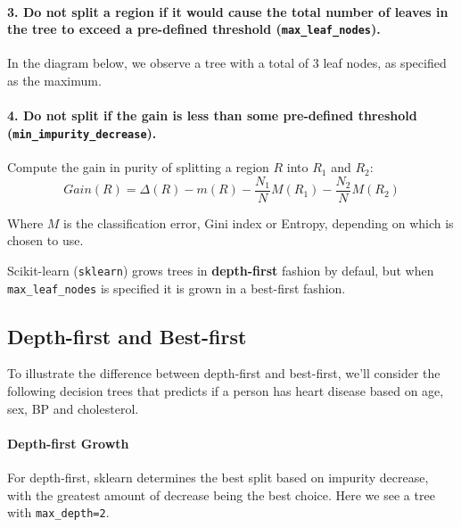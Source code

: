 \documentclass[10pt,a4paper]{report}
\begin{document}
\paragraph{3. Do not split a region if it would cause the total number of leaves in the tree to exceed a pre-defined threshold (\texttt{max\_leaf\_nodes}).}In the diagram below, we observe a tree with a total of 3 leaf nodes, as specified as the maximum.\\
\paragraph{4. Do not split if the gain is less than some pre-defined threshold (\texttt{min\_impurity\_decrease}).}Compute the gain in purity of splitting a region $R$ into $R_1$ and $R_2$:$$Gain(R) = \Delta(R) - m(R) - \frac{N_1}{N}M(R_1) - \frac{N_2}{N}M(R_2)$$
\begin{framed}
Where $M$ is the 	classification error, Gini index or Entropy, depending on which is chosen to use.
\end{framed}
Scikit-learn (\texttt{sklearn}) grows trees in \textbf{depth-first} fashion by defaul, but when \texttt{max\_leaf\_nodes} is specified it is grown in a best-first fashion.
\subsection{Depth-first and Best-first}
To illustrate the difference between depth-first and best-first, we’ll consider the following decision trees that predicts if a person has heart disease based on age, sex, BP and cholesterol.
\paragraph{Depth-first Growth}For depth-first, sklearn determines the best split based on impurity decrease, with the greatest amount of decrease being the best choice. Here we see a tree with \texttt{max\_depth=2}.\\
\end{document}
